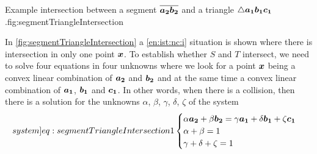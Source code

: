\documentclass[dissertation.tex]{subfiles}
\begin{document}
\begin{myfig}{Example intersection between a segment
    $\overline{\boldsymbol{a_2}\boldsymbol{b_2}}$ and a triangle $\triangle \boldsymbol{a_1}\boldsymbol{b_1}\boldsymbol{c_1}$.}{fig:segmentTriangleIntersection}
\end{myfig}
In \cref{fig:segmentTriangleIntersection} a
\cref{en:ist:nc:i} situation is shown where there is intersection in
only one 
point $\boldsymbol{x}$. To establish whether $S$ and $T$ intersect, we need to
solve 
four equations in four unknowns \cite{schneider} where we look for a point
$\boldsymbol{x}$ being a convex linear
combination of $\boldsymbol{a_2}$ and $\boldsymbol{b_2}$ and at the same time a convex
linear combination of $\boldsymbol{a_1}$,
$\boldsymbol{b_1}$ and $\boldsymbol{c_1}$. In other words, when there is a collision,
then there is a solution for the unknowns
$\alpha$, $\beta$, $\gamma$, $\delta$, $\zeta$ of the system
\begin{equation}\label[system]{eq:segmentTriangleIntersection1}
  \begin{cases}
    \alpha \ve{a_2} + \beta\ve{b_2}=\gamma\ve{a_1}+\delta\ve{b_1}+\zeta\ve{c_1} \\
    \alpha + \beta = 1\\
    \gamma + \delta +\zeta=1
  \end{cases}
\end{equation}
\end{document}
